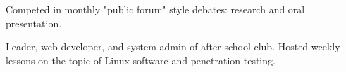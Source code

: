 
\begin{cventries}

  {Competed in monthly "public forum" style debates: research and oral presentation.}
  
  {Leader, web developer, and system admin of after-school club. Hosted weekly lessons on the topic of Linux software and penetration testing.}


\end{cventries}


